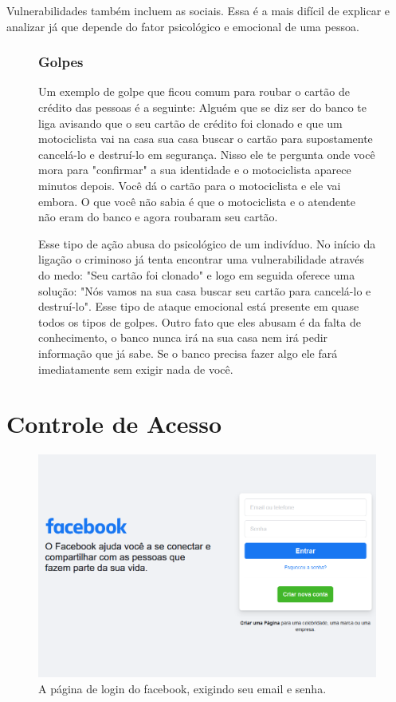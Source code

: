 Vulnerabilidades também incluem as sociais. Essa é a mais difícil de explicar e analizar já que depende do fator psicológico e emocional de uma pessoa.

\begin{figure}[htb]
\begin{ficadica}
    \subsubsection*{Golpes}
    Um exemplo de golpe que ficou comum para roubar o cartão de crédito das pessoas é a seguinte: Alguém que se diz ser do banco te liga avisando que o seu cartão de crédito foi clonado e que um motociclista vai na casa sua casa buscar o cartão para supostamente cancelá-lo e destruí-lo em segurança. Nisso ele te pergunta onde você mora para "confirmar" a sua identidade e o motociclista aparece minutos depois. Você dá o cartão para o motociclista e ele vai embora. O que você não sabia é que o motociclista e o atendente não eram do banco e agora roubaram seu cartão.

    Esse tipo de ação abusa do psicológico de um indivíduo. No início da ligação o criminoso já tenta encontrar uma vulnerabilidade através do medo: "Seu cartão foi clonado" e logo em seguida oferece uma solução: "Nós vamos na sua casa buscar seu cartão para cancelá-lo e destruí-lo". Esse tipo de ataque emocional está presente em quase todos os tipos de golpes. Outro fato que eles abusam é da falta de conhecimento, o banco nunca irá na sua casa nem irá pedir informação que já sabe. Se o banco precisa fazer algo ele fará imediatamente sem exigir nada de você.
\end{ficadica}
\end{figure}

\section{Controle de Acesso}

\begin{figure}[hb]
    \centering
    \includegraphics[width=\textwidth]{img/facebook.png}
    \caption{A página de login do facebook, exigindo seu email e senha.}
    \label{fig:facebook}
\end{figure}

